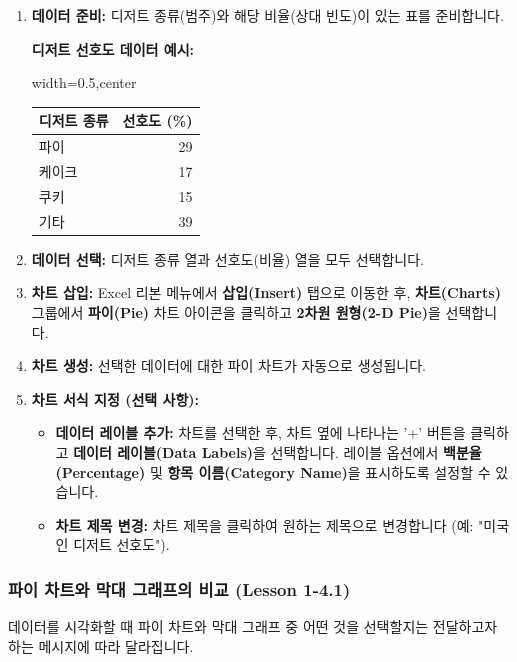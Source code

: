 \documentclass[11pt,a4paper]{article}
\begin{document}
\begin{enumerate}
    \item \textbf{데이터 준비:} 디저트 종류(범주)와 해당 비율(상대 빈도)이 있는 표를 준비합니다.
    \begin{examplebox}
    \textbf{디저트 선호도 데이터 예시:}
    \begin{adjustbox}{width=0.5\textwidth,center}
    \begin{tabular}{lr}
    \toprule
    \textbf{디저트 종류} & \textbf{선호도 (\%)} \\
    \midrule
    파이 & 29 \\
    케이크 & 17 \\
    쿠키 & 15 \\
    기타 & 39 \\ %
    \bottomrule
    \end{tabular}
    \end{adjustbox}
    \end{examplebox}
    \item \textbf{데이터 선택:} 디저트 종류 열과 선호도(비율) 열을 모두 선택합니다.
    \item \textbf{차트 삽입:} Excel 리본 메뉴에서 \textbf{삽입(Insert)} 탭으로 이동한 후, \textbf{차트(Charts)} 그룹에서 \textbf{파이(Pie)} 차트 아이콘을 클릭하고 \textbf{2차원 원형(2-D Pie)}을 선택합니다.
    \item \textbf{차트 생성:} 선택한 데이터에 대한 파이 차트가 자동으로 생성됩니다.
    \item \textbf{차트 서식 지정 (선택 사항):}
    \begin{itemize}
        \item \textbf{데이터 레이블 추가:} 차트를 선택한 후, 차트 옆에 나타나는 '+' 버튼을 클릭하고 \textbf{데이터 레이블(Data Labels)}을 선택합니다. 레이블 옵션에서 \textbf{백분율(Percentage)} 및 \textbf{항목 이름(Category Name)}을 표시하도록 설정할 수 있습니다.
        \item \textbf{차트 제목 변경:} 차트 제목을 클릭하여 원하는 제목으로 변경합니다 (예: "미국인 디저트 선호도").
    \end{itemize}
\end{enumerate}

\subsubsection*{파이 차트와 막대 그래프의 비교 (Lesson 1-4.1)}

데이터를 시각화할 때 파이 차트와 막대 그래프 중 어떤 것을 선택할지는 전달하고자 하는 메시지에 따라 달라집니다.
\end{document}
